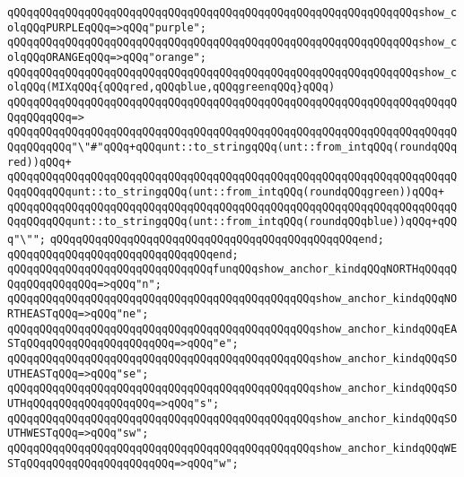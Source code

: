 \verb|qQQqqQQqqQQqqQQqqQQqqQQqqQQqqQQqqQQqqQQqqQQqqQQqqQQqqQQqqQQqqQQqshow_colqQQqPURPLEqQQq=>qQQq"purple";|\newline
\verb|qQQqqQQqqQQqqQQqqQQqqQQqqQQqqQQqqQQqqQQqqQQqqQQqqQQqqQQqqQQqqQQqshow_colqQQqORANGEqQQq=>qQQq"orange";|\newline
\newline
\verb|qQQqqQQqqQQqqQQqqQQqqQQqqQQqqQQqqQQqqQQqqQQqqQQqqQQqqQQqqQQqqQQqshow_colqQQq(MIXqQQq{qQQqred,qQQqblue,qQQqgreenqQQq}qQQq)|\newline
\verb|qQQqqQQqqQQqqQQqqQQqqQQqqQQqqQQqqQQqqQQqqQQqqQQqqQQqqQQqqQQqqQQqqQQqqQQqqQQqqQQq=>|\newline
\verb|qQQqqQQqqQQqqQQqqQQqqQQqqQQqqQQqqQQqqQQqqQQqqQQqqQQqqQQqqQQqqQQqqQQqqQQqqQQqqQQq"\"#"qQQq+qQQqunt::to_stringqQQq(unt::from_intqQQq(roundqQQqred))qQQq+|\newline
\verb|qQQqqQQqqQQqqQQqqQQqqQQqqQQqqQQqqQQqqQQqqQQqqQQqqQQqqQQqqQQqqQQqqQQqqQQqqQQqqQQqunt::to_stringqQQq(unt::from_intqQQq(roundqQQqgreen))qQQq+|\newline
\verb|qQQqqQQqqQQqqQQqqQQqqQQqqQQqqQQqqQQqqQQqqQQqqQQqqQQqqQQqqQQqqQQqqQQqqQQqqQQqqQQqunt::to_stringqQQq(unt::from_intqQQq(roundqQQqblue))qQQq+qQQq"\"";|\newline
\verb|qQQqqQQqqQQqqQQqqQQqqQQqqQQqqQQqqQQqqQQqqQQqqQQqend;|\newline
\verb|qQQqqQQqqQQqqQQqqQQqqQQqqQQqqQQqend;|\newline
\newline
\verb|qQQqqQQqqQQqqQQqqQQqqQQqqQQqqQQqfunqQQqshow_anchor_kindqQQqNORTHqQQqqQQqqQQqqQQqqQQq=>qQQq"n";|\newline
\verb|qQQqqQQqqQQqqQQqqQQqqQQqqQQqqQQqqQQqqQQqqQQqqQQqshow_anchor_kindqQQqNORTHEASTqQQq=>qQQq"ne";|\newline
\verb|qQQqqQQqqQQqqQQqqQQqqQQqqQQqqQQqqQQqqQQqqQQqqQQqshow_anchor_kindqQQqEASTqQQqqQQqqQQqqQQqqQQqqQQq=>qQQq"e";|\newline
\verb|qQQqqQQqqQQqqQQqqQQqqQQqqQQqqQQqqQQqqQQqqQQqqQQqshow_anchor_kindqQQqSOUTHEASTqQQq=>qQQq"se";|\newline
\verb|qQQqqQQqqQQqqQQqqQQqqQQqqQQqqQQqqQQqqQQqqQQqqQQqshow_anchor_kindqQQqSOUTHqQQqqQQqqQQqqQQqqQQq=>qQQq"s";|\newline
\verb|qQQqqQQqqQQqqQQqqQQqqQQqqQQqqQQqqQQqqQQqqQQqqQQqshow_anchor_kindqQQqSOUTHWESTqQQq=>qQQq"sw";|\newline
\verb|qQQqqQQqqQQqqQQqqQQqqQQqqQQqqQQqqQQqqQQqqQQqqQQqshow_anchor_kindqQQqWESTqQQqqQQqqQQqqQQqqQQqqQQq=>qQQq"w";|\newline
